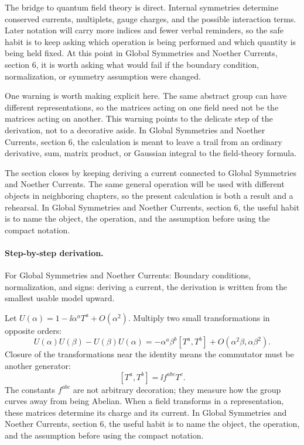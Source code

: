 The bridge to quantum field theory is direct.  Internal symmetries determine conserved currents, multiplets, gauge charges, and the possible interaction terms.  Later notation will carry more indices and fewer verbal reminders, so the safe habit is to keep asking which operation is being performed and which quantity is being held fixed.  At this point in Global Symmetries and Noether Currents, section 6, it is worth asking what would fail if the boundary condition, normalization, or symmetry assumption were changed.

One warning is worth making explicit here.  The same abstract group can have different representations, so the matrices acting on one field need not be the matrices acting on another.  This warning points to the delicate step of the derivation, not to a decorative aside.  In Global Symmetries and Noether Currents, section 6, the calculation is meant to leave a trail from an ordinary derivative, sum, matrix product, or Gaussian integral to the field-theory formula.

The section closes by keeping deriving a current connected to Global Symmetries and Noether Currents.  The same general operation will be used with different objects in neighboring chapters, so the present calculation is both a result and a rehearsal.  In Global Symmetries and Noether Currents, section 6, the useful habit is to name the object, the operation, and the assumption before using the compact notation.



\paragraph{Step-by-step derivation.}

For Global Symmetries and Noether Currents: Boundary conditions, normalization, and signs: deriving a current, the derivation is written from the smallest usable model upward.

Let \(U(\alpha)=1-\ii\alpha^aT^a+O(\alpha^2)\).  Multiply two small transformations in opposite orders:
\[
  U(\alpha)U(\beta)-U(\beta)U(\alpha)
  =
  -\alpha^a\beta^b[T^a,T^b]+O(\alpha^2\beta,\alpha\beta^2).
\]
Closure of the transformations near the identity means the commutator must be another generator:
\[
  [T^a,T^b]=\ii f^{abc}T^c.
\]
The constants \(f^{abc}\) are not arbitrary decoration; they measure how the group curves away from being Abelian.  When a field transforms in a representation, these matrices determine its charge and its current.  In Global Symmetries and Noether Currents, section 6, the useful habit is to name the object, the operation, and the assumption before using the compact notation.

